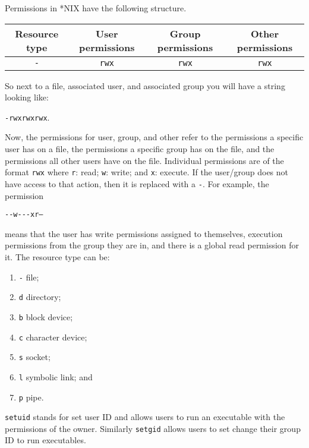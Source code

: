 \begin{example}
    Permissions in *NIX have the following structure.
    \begin{center}
        \begin{tabular}{cccc}
            \toprule
            Resource type & User permissions & Group permissions & Other permissions \\
            \midrule
            \texttt{-} & \texttt{rwx} & \texttt{rwx} & \texttt{rwx} \\
            \bottomrule
        \end{tabular}
    \end{center}
    So next to a file, associated user, and associated group you will have a string looking like:
    \begin{center}
        \texttt{-rwxrwxrwx}.
    \end{center}
    Now, the permissions for user, group, and other refer to the permissions a specific user has on a file, the permissions a specific group has on the file, and the permissions all other users have on the file. Individual permissions are of the format \texttt{rwx} where \texttt{r}: read; \texttt{w}: write; and \texttt{x}: execute. If the user/group does not have access to that action, then it is replaced with a \texttt{-}. For example, the permission
    \begin{center}
        \texttt{-}\texttt{-w-}\texttt{-}\texttt{-x}\texttt{r--}
    \end{center}
    means that the user has write permissions assigned to themselves, execution permissions from the group they are in, and there is a global read permission for it. The resource type can be:
    \begin{enumerate}
        \item \texttt{-} file;
        \item \texttt{d} directory;
        \item \texttt{b} block device;
        \item \texttt{c} character device;
        \item \texttt{s} socket;
        \item \texttt{l} symbolic link; and
        \item \texttt{p} pipe.
    \end{enumerate}
\end{example}

\begin{example}
    \texttt{setuid} stands for set user ID and allows users to run an executable with the permissions of the owner. Similarly \texttt{setgid} allows users to set change their group ID to run executables.
\end{example}

